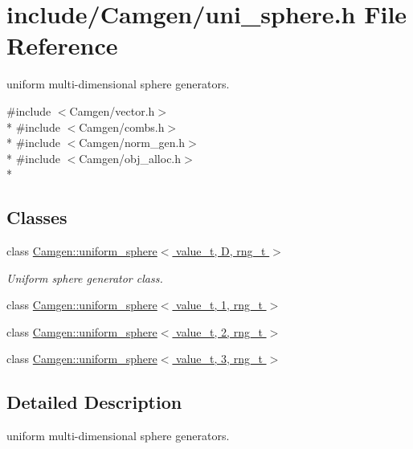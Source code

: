 \hypertarget{a00822}{}\section{include/\+Camgen/uni\+\_\+sphere.h File Reference}
\label{a00822}


uniform multi-\/dimensional sphere generators.  


{\ttfamily \#include $<$Camgen/vector.\+h$>$}\\*
{\ttfamily \#include $<$Camgen/combs.\+h$>$}\\*
{\ttfamily \#include $<$Camgen/norm\+\_\+gen.\+h$>$}\\*
{\ttfamily \#include $<$Camgen/obj\+\_\+alloc.\+h$>$}\\*
\subsection*{Classes}
\begin{DoxyCompactItemize}
\item 
class \hyperlink{a00566}{Camgen\+::uniform\+\_\+sphere$<$ value\+\_\+t, D, rng\+\_\+t $>$}
\begin{DoxyCompactList}\small\item\em Uniform sphere generator class. \end{DoxyCompactList}\item 
class \hyperlink{a00567}{Camgen\+::uniform\+\_\+sphere$<$ value\+\_\+t, 1, rng\+\_\+t $>$}
\item 
class \hyperlink{a00568}{Camgen\+::uniform\+\_\+sphere$<$ value\+\_\+t, 2, rng\+\_\+t $>$}
\item 
class \hyperlink{a00569}{Camgen\+::uniform\+\_\+sphere$<$ value\+\_\+t, 3, rng\+\_\+t $>$}
\end{DoxyCompactItemize}


\subsection{Detailed Description}
uniform multi-\/dimensional sphere generators. 

